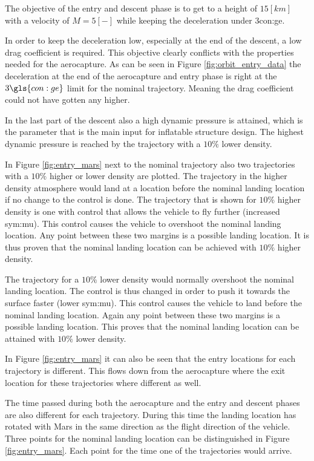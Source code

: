 The objective of the entry and descent phase is to get to a height of $15 \left[km\right]$ with a velocity of $M = 5\left[-\right]$ while keeping the deceleration under 3\gls{con:ge}.

In order to keep the deceleration low, especially at the end of the descent, a low drag coefficient is required. This objective clearly conflicts with the properties needed for the aerocapture. As can be seen in Figure \ref{fig:orbit_entry_data} the deceleration at the end of the aerocapture and entry phase is right at the $3\gls{con:ge}$ limit for the nominal trajectory. Meaning the drag coefficient could not have gotten any higher.

In the last part of the descent also a high dynamic pressure is attained, which is the parameter that is the main input for inflatable structure design. The highest dynamic pressure is reached by the trajectory with a $10\%$ lower density.

In Figure \ref{fig:entry_mars} next to the nominal trajectory also two trajectories with a $10\%$ higher or lower density are plotted. The trajectory in the higher density atmosphere would land at a location before the nominal landing location if no change to the control is done. The trajectory that is shown for $10\%$ higher density is one with control that allows the vehicle to fly further (increased \gls{sym:mu}). This control causes the vehicle to overshoot the nominal landing location. Any point between these two margins is a possible landing location. It is thus proven that the nominal landing location can be achieved with $10\%$ higher density.

The trajectory for a $10\%$ lower density would normally overshoot the nominal landing location. The control is thus changed in order to push it towards the surface faster (lower \gls{sym:mu}). This control causes the vehicle to land before the nominal landing location. Again any point between these two margins is a possible landing location. This proves that the nominal landing location can be attained with $10\%$ lower density.

In Figure \ref{fig:entry_mars} it can also be seen that the entry locations for each trajectory is different. This flows down from the aerocapture where the exit location for these trajectories where different as well.

The time passed during both the aerocapture and the entry and descent phases are also different for each trajectory. During this time the landing location has rotated with Mars in the same direction as the flight direction of the vehicle. Three points for the nominal landing location can be distinguished in Figure \ref{fig:entry_mars}. Each point for the time one of the trajectories would arrive.

